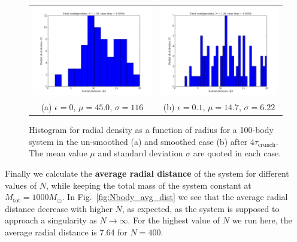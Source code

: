 \documentclass{article}
\begin{document}
\begin{multicols}{2}
\begin{figure}
\begin{center}
\begin{tabular}{cc}
  	\includegraphics[width=90mm]{Images/radial_dist_N100_nosmooth.png}
	& \includegraphics[width=90mm]{Images/radial_dist_N100.png} \\
	(a) $\epsilon = 0$, $\mu = 45.0$, $\sigma = 116$		& (b) $\epsilon = 0.1$, $\mu = 14.7$, $\sigma = 6.22$  \\[6pt]
\end{tabular}
\caption{Histogram for radial density as a function of radius for a 100-body system in the un-smoothed (a) and smoothed case (b) after $4 \tau_{\mathrm{crunch}}$. The mean value $\mu$ and standard deviation $\sigma$ are quoted in each case.}\label{fig:Nbody_histogram}
\end{center}
\end{figure}
Finally we calculate the \textbf{average radial distance} of the system for different values of $N$, while keeping the total mass of the system constant at $M_{\mathrm{tot}} = 1000 M_{\odot}$. In Fig.~\ref{fig:Nbody_avg_dist} we see that the average radial distance decrease with higher $N$, as expected, as the system is supposed to approach a singularity as $N \rightarrow \infty$. For the highest value of $N$ we run here, the average radial distance is 7.64 for $N = 400$. 


\end{multicols}
\end{document}
